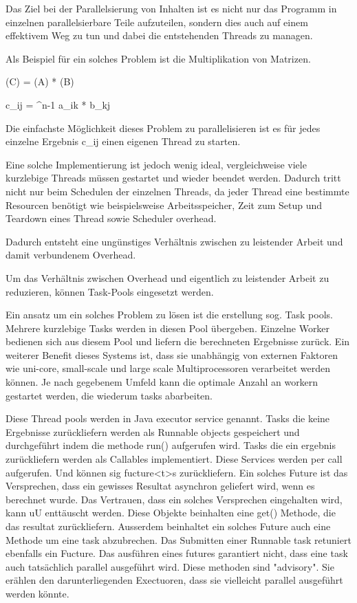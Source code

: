 Das Ziel bei der Parallelsierung von Inhalten ist es nicht nur das Programm in einzelnen parallelsierbare Teile aufzuteilen, sondern dies auch auf einem effektivem Weg zu tun und dabei die entstehenden Threads zu managen.

Als Beispiel für ein solches Problem ist die Multiplikation von Matrizen.

(C) = (A) * (B)

c_ij = ^{n-1} a_ik * b_kj


Die einfachste Möglichkeit dieses Problem zu parallelisieren ist es für jedes einzelne Ergebnis c_ij
einen eigenen Thread zu starten.

Eine solche Implementierung ist jedoch wenig ideal, vergleichweise viele kurzlebige Threads müssen gestartet und wieder beendet werden. Dadurch tritt nicht nur beim Schedulen der einzelnen Threads, da jeder Thread eine bestimmte Resourcen benötigt wie beispielsweise Arbeitsspeicher, Zeit zum Setup und Teardown eines Thread sowie Scheduler overhead.

Dadurch entsteht eine ungünstiges Verhältnis zwischen zu leistender Arbeit und damit verbundenem Overhead.

Um das Verhältnis zwischen Overhead und eigentlich zu leistender Arbeit zu reduzieren, können Task-Pools eingesetzt werden.






Ein ansatz um ein solches Problem zu lösen ist die erstellung sog. Task pools. Mehrere kurzlebige Tasks werden in diesen Pool übergeben. Einzelne Worker bedienen sich aus diesem Pool und liefern die berechneten Ergebnisse zurück. Ein weiterer Benefit dieses Systems ist, dass sie unabhängig von externen Faktoren wie uni-core, small-scale und large scale Multiprocessoren verarbeitet werden können. Je nach gegebenem Umfeld kann die optimale Anzahl an workern gestartet werden, die wiederum tasks abarbeiten.

Diese Thread pools werden in Java executor service genannt. Tasks die keine Ergebnisse zurückliefern werden als Runnable objects gespeichert und durchgeführt indem die methode run() aufgerufen wird. Tasks die ein ergebnis zurückliefern werden als Callables implementiert. Diese Services werden per call aufgerufen. Und können sig fucture<t>s zurückliefern. Ein solches Future ist das Versprechen, dass ein gewisses Resultat asynchron geliefert wird, wenn es berechnet wurde. Das Vertrauen, dass ein solches Versprechen eingehalten wird, kann uU enttäuscht werden. Diese Objekte beinhalten eine get() Methode, die das resultat zurückliefern. Ausserdem beinhaltet ein solches Future auch eine Methode um eine task abzubrechen. Das Submitten einer Runnable task retuniert ebenfalls ein Fucture. Das ausführen eines futures garantiert nicht, dass eine task auch tatsächlich parallel ausgeführt wird. Diese methoden sind "advisory". Sie erählen den darunterliegenden Exectuoren, dass sie vielleicht parallel ausgeführt werden könnte.

